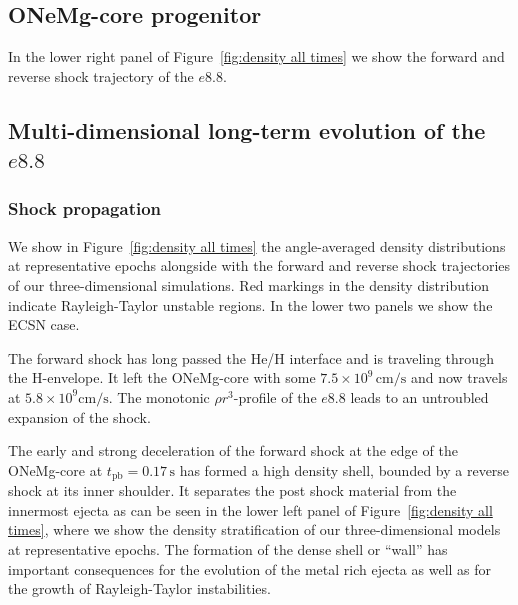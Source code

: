 \documentclass[fleqn,usenatbib]{mnras}
\newcommand{\tpb}{\ensuremath{t_{\text{pb}}}}
\begin{document}
\subsection{ONeMg-core progenitor}
\label{sec:Long-term evolution of the e8.8}

In the lower right panel of Figure~\ref{fig:density all times} we show the forward and reverse shock trajectory of the $e8.8$.


\subsection{Multi-dimensional long-term evolution of the $e8.8$}
\label{sec:Multi-dimensional long-term evolution of the e8.8}
\subsubsection{Shock propagation}
\label{sec:shock propagation e8.8}
We show in Figure~\ref{fig:density all times} the angle-averaged density distributions at representative epochs alongside with the forward and reverse shock trajectories of our three-dimensional simulations. Red markings in the density distribution indicate Rayleigh-Taylor unstable regions. In the lower two panels we show the ECSN case.

The forward shock has long passed the He/H interface and is traveling through the H-envelope. It left the ONeMg-core with some $7.5\times 10^{9}\,\text{cm/s}$ and now travels at $5.8\times 10^{9}\mathrm{cm/s}$. The monotonic $\rho r^3$-profile of the $e8.8$ leads to an untroubled expansion of the shock.

The early and strong deceleration of the forward shock at the edge of the ONeMg-core at $\tpb=0.17\,\text{s}$ has formed a high density shell, bounded by a reverse shock at its inner shoulder. It separates the post shock material from the innermost ejecta as can be seen in the lower left panel of Figure~\ref{fig:density all times}, where we show the density stratification of our three-dimensional models at representative epochs. The formation of the dense shell or ``wall'' \cite{Kifonidis2006} has important consequences for the evolution of the metal rich ejecta as well as for the growth of Rayleigh-Taylor instabilities. 
\end{document}
